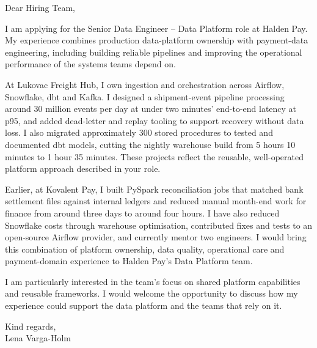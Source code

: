 \documentclass[11pt,a4paper]{article}
\begin{document}
\noindent Dear Hiring Team,

I am applying for the Senior Data Engineer -- Data Platform role at Halden Pay. My experience combines production data-platform ownership with payment-data engineering, including building reliable pipelines and improving the operational performance of the systems teams depend on.

At Lukovac Freight Hub, I own ingestion and orchestration across Airflow, Snowflake, dbt and Kafka. I designed a shipment-event pipeline processing around 30 million events per day at under two minutes' end-to-end latency at p95, and added dead-letter and replay tooling to support recovery without data loss. I also migrated approximately 300 stored procedures to tested and documented dbt models, cutting the nightly warehouse build from 5 hours 10 minutes to 1 hour 35 minutes. These projects reflect the reusable, well-operated platform approach described in your role.

Earlier, at Kovalent Pay, I built PySpark reconciliation jobs that matched bank settlement files against internal ledgers and reduced manual month-end work for finance from around three days to around four hours. I have also reduced Snowflake costs through warehouse optimisation, contributed fixes and tests to an open-source Airflow provider, and currently mentor two engineers. I would bring this combination of platform ownership, data quality, operational care and payment-domain experience to Halden Pay's Data Platform team.

I am particularly interested in the team's focus on shared platform capabilities and reusable frameworks. I would welcome the opportunity to discuss how my experience could support the data platform and the teams that rely on it.

Kind regards,\\
Lena Varga-Holm
\end{document}

